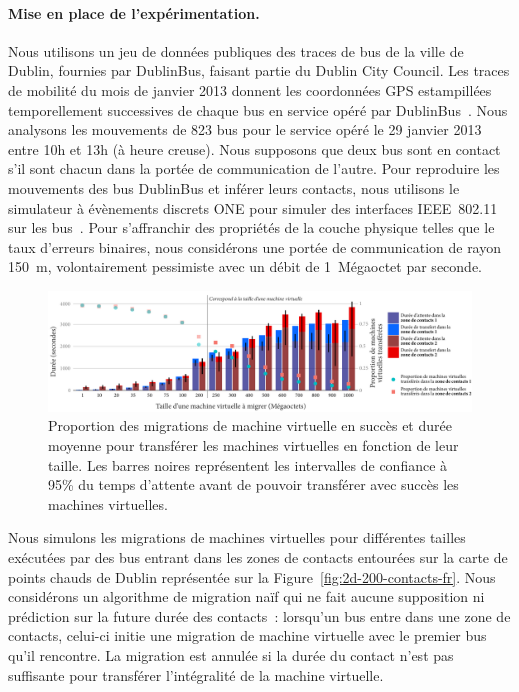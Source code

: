 \paragraph{Mise en place de l’expérimentation.} 
Nous utilisons un jeu de données publiques des traces de bus de la ville de Dublin, fournies par DublinBus, faisant partie du Dublin City Council. Les traces de mobilité du mois de janvier 2013 donnent les coordonnées GPS estampillées temporellement successives de chaque bus en service opéré par DublinBus~\cite{dublinked}. Nous analysons les mouvements de 823 bus pour le service opéré le 29 janvier 2013 entre 10h et 13h (à heure creuse). Nous supposons que deux bus sont en contact s’il sont chacun dans la portée de communication de l’autre. Pour reproduire les mouvements des bus DublinBus et inférer leurs contacts, nous utilisons le simulateur à évènements discrets ONE pour simuler des interfaces IEEE~802.11 sur les bus~\cite{keranen2009one}. Pour s’affranchir des propriétés de la couche physique telles que le taux d’erreurs binaires, nous considérons une portée de communication de rayon 150~m, volontairement pessimiste avec un débit de 1~Mégaoctet par seconde. 
 
 
\begin{figure}[t!] 
  \centering 
  \includegraphics[width=0.98\linewidth]{figures-fr/duration-ratio-migrations-fr.pdf} 
  \caption{Proportion des migrations de machine virtuelle en succès et durée moyenne pour transférer les machines virtuelles en fonction de leur taille. Les barres noires représentent les intervalles de confiance à 95\% du temps d’attente avant de pouvoir transférer avec succès les machines virtuelles.} 
  \label{fig:duration-ratio-migrations-fr} 
\end{figure}  
 
 
Nous simulons les migrations de machines virtuelles pour différentes tailles exécutées par des bus entrant dans les zones de contacts entourées sur la carte de points chauds de Dublin représentée sur la Figure~\ref{fig:2d-200-contacts-fr}. Nous considérons un algorithme de migration naïf qui ne fait aucune supposition ni prédiction sur la future durée des contacts~: lorsqu’un bus entre dans une zone de contacts, celui-ci initie une migration de machine virtuelle avec le premier bus qu’il rencontre. La migration est annulée si la durée du contact n’est pas suffisante pour transférer l’intégralité de la machine virtuelle. 
 

